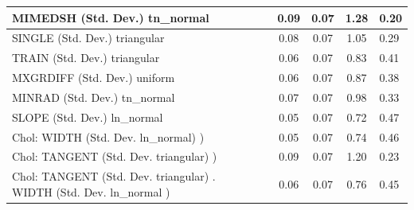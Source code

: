 \begin{table}
\begin{center}
\begin{tabular}{|l|l|c|c|c|l|}
			MIMEDSH (Std. Dev.) tn_normal &  & 0.09 & 0.07 & 1.28 & 0.20 \\
			\hline
			SINGLE (Std. Dev.) triangular &  & 0.08 & 0.07 & 1.05 & 0.29 \\
			\hline
			TRAIN (Std. Dev.) triangular &  & 0.06 & 0.07 & 0.83 & 0.41 \\
			\hline
			MXGRDIFF (Std. Dev.) uniform &  & 0.06 & 0.07 & 0.87 & 0.38 \\
			\hline
			MINRAD (Std. Dev.) tn_normal &  & 0.07 & 0.07 & 0.98 & 0.33 \\
			\hline
			SLOPE (Std. Dev.) ln_normal &  & 0.05 & 0.07 & 0.72 & 0.47 \\
			\hline
			 Chol: WIDTH (Std. Dev. ln_normal) ) &  & 0.05 & 0.07 & 0.74 & 0.46 \\
			\hline
			 Chol: TANGENT (Std. Dev. triangular) ) &  & 0.09 & 0.07 & 1.20 & 0.23 \\
			\hline
			 Chol: TANGENT (Std. Dev. triangular) . WIDTH (Std. Dev.   ln_normal ) &  & 0.06 & 0.07 & 0.76 & 0.45 \\
			\hline
		\end{tabular}
	\end{center}
\end{table}